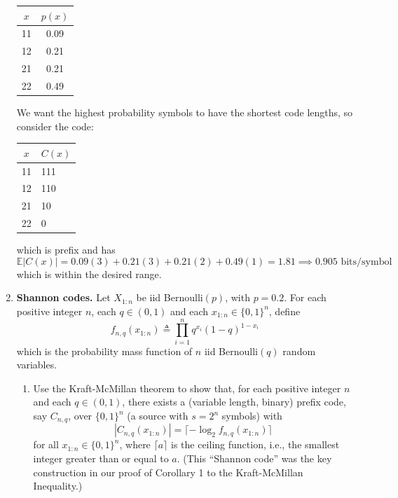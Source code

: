 \documentclass[11pt]{report}
\newcommand{\teq}{\triangleq}
\newcommand{\E}{\mathbb{E}}
\newcommand{\abs}[1]{\left\vert #1 \right\vert}
\begin{document}
\begin{enumerate}[1.]
          \qquad \begin{tabular}{cc}
              $x$ & $p(x)$ \\ \hline
              11  & 0.09   \\
              12  & 0.21   \\
              21  & 0.21   \\
              22  & 0.49
          \end{tabular}

          We want the highest probability symbols to have the shortest code lengths, so consider the code:

          \qquad \begin{tabular}{cl}
              $x$ & $C(x)$ \\ \hline
              11  & 111    \\
              12  & 110    \\
              21  & 10     \\
              22  & 0
          \end{tabular}

          which is prefix and has
          \[\E\abs{C(x)} = 0.09(3) + 0.21(3) + 0.21(2) + 0.49(1) = 1.81 \implies 0.905 \text{ bits/symbol}\]
          which is within the desired range.


          \color{black}


          \pagebreak





    \item {\bf Shannon codes.} Let $X_{1:n}$ be iid Bernoulli$(p)$, with $p=0.2$.  For each positive integer $n$, each $q\in(0,1)$ and each $x_{1:n}\in\{0,1\}^n$, define
          \[ f_{n,q}(x_{1:n}) \teq \prod_{i=1}^n q^{x_i}(1-q)^{1-x_i} \]
          which is the probability mass function of $n$ iid Bernoulli$(q)$ random variables.

          \begin{enumerate}
              \item Use the Kraft-McMillan theorem to show that, for each positive integer $n$ and each $q\in(0,1)$, there exists a (variable length, binary) prefix code, say $C_{n,q}$, over $\{0,1\}^n$ (a source with $s=2^n$ symbols) with
                    \[ |C_{n,q}(x_{1:n})| = \lceil-\log_2 f_{n,q}(x_{1:n})\rceil \]
                    for all $x_{1:n}\in\{0,1\}^n$, where $\lceil a \rceil$ is the ceiling function, i.e., the smallest integer greater than or equal to $a$.
                    (This ``Shannon code'' was the key construction in our proof of Corollary 1 to the Kraft-McMillan Inequality.)


\end{enumerate}
\end{enumerate}
\end{document}
